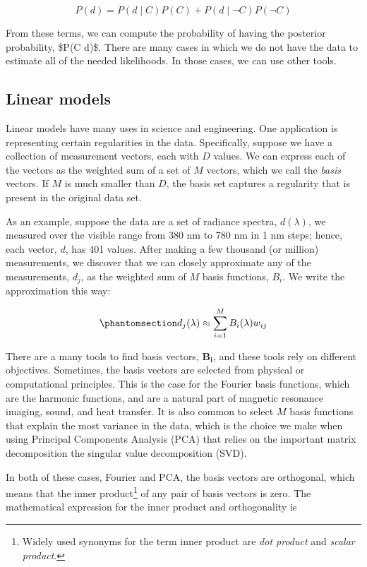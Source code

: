 \documentclass[
  letterpaper,
]{book}
\begin{document}
\[
P(d) = P(d \mid C) P(C) + P(d \mid \neg C) P(\neg C)
\]

From these terms, we can compute the probability of having the posterior
probability, \$P(C \mid d)\$. There are many cases in which we do not
have the data to estimate all of the needed likelihoods. In those cases,
we can use other tools.

\subsection{Linear models}\label{sec-linear-models}

Linear models have many uses in science and engineering. One application
is representing certain regularities in the data. Specifically, suppose
we have a collection of measurement vectors, each with \(D\) values. We
can express each of the vectors as the weighted sum of a set of \(M\)
vectors, which we call the \emph{basis} vectors. If \(M\) is much
smaller than \(D\), the basis set captures a regularity that is present
in the original data set.

As an example, suppose the data are a set of radiance spectra,
\(d(\lambda)\), we measured over the visible range from 380 nm to 780 nm
in 1 nm steps; hence, each vector, \(d\), has 401 values. After making a
few thousand (or million) measurements, we discover that we can closely
approximate any of the measurements, \(d_j\), as the weighted sum of
\(M\) basis functions, \(B_i\). We write the approximation this way:

\begin{equation}\phantomsection\label{eq-linear1}{
d_j(\lambda) \approx \sum_{i=1}^{M} B_i(\lambda) w_{ij}
}\end{equation}

There are a many tools to find basis vectors, \(\mathbf{B_i}\), and
these tools rely on different objectives. Sometimes, the basis vectors
are selected from physical or computational principles. This is the case
for the Fourier basis functions, which are the harmonic functions, and
are a natural part of magnetic resonance imaging, sound, and heat
transfer. It is also common to select \(M\) basis functions that explain
the most variance in the data, which is the choice we make when using
Principal Components Analysis (PCA) that relies on the important matrix
decomposition the singular value decomposition (SVD).

In both of these cases, Fourier and PCA, the basis vectors are
orthogonal, which means that the inner product\footnote{Widely used
  synonyms for the term inner product are \emph{dot product} and
  \emph{scalar product}.} of any pair of basis vectors is zero. The
mathematical expression for the inner product and orthogonality is
\end{document}
